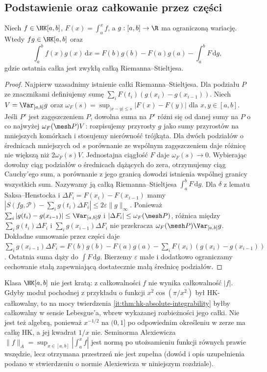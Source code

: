 \subsection{Podstawienie oraz całkowanie przez części}
\begin{twierdzenie}\label{ma1:kh:thm:bv-multiplier}
Niech $f\in\HK[a,b]$, $F(x)=\int_a^x f$, a $g:[a,b]\to\R$ ma ograniczoną wariację. Wtedy $fg\in\HK[a,b]$ oraz
\[
\int_a^b f(x)g(x)\,\mathrm dx=F(b)g(b)-F(a)g(a)-\int_a^b F\,\mathrm dg,
\]
gdzie ostatnia całka jest zwykłą całką Riemanna--Stieltjesa.
\end{twierdzenie}
\begin{proof}
Najpierw uzasadnimy istnienie całki Riemanna--Stieltjesa. Dla podziału $P$ ze znacznikami definiujemy sumę $\sum_i F(t_i)(g(x_i)-g(x_{i-1}))$. Niech $V=\Var_{[a,b]}g$ oraz $\omega_F(s)=\sup_{|x-y|\le s}|F(x)-F(y)|$ dla $x,y\in[a,b]$. Jeśli $P'$ jest zagęszczeniem $P$, dowolna suma na $P'$ różni się od danej sumy na $P$ o co najwyżej $\omega_F(\mesh P)V$: rozpisujemy przyrosty $g$ jako sumy przyrostów na mniejszych komórkach i stosujemy nierówność trójkąta. Dla dwóch podziałów o średnicach mniejszych od $s$ porównanie ze wspólnym zagęszczeniem daje różnicę nie większą niż $2\omega_F(s)V$. Jednostajna ciągłość $F$ daje $\omega_F(s)\to0$. Wybierając dowolny ciąg podziałów o średnicach dążących do zera, otrzymujemy ciąg Cauchy'ego sum, a porównanie z jego granicą dowodzi istnienia wspólnej granicy wszystkich sum. Nazywamy ją całką Riemanna--Stieltjesa $\int_a^b F\,\mathrm dg$. Dla $\delta$ z lematu Saksa--Henstocka i $\Delta F_i=F(x_i)-F(x_{i-1})$ mamy
$|S(fg,\mathcal P)-\sum_i g(t_i)\Delta F_i|\le2\varepsilon\|g\|_\infty$.
Ponieważ $\sum_i|g(t_i)-g(x_{i-1})|\le \Var_{[a,b]}g$ i $|\Delta F_i|\le\omega_F(\mesh P)$, różnica między $\sum_i g(t_i)\Delta F_i$ i $\sum_i g(x_{i-1})\Delta F_i$ nie przekracza $\omega_F(\mesh P)\Var_{[a,b]}g$. Dokładne sumowanie przez części daje
$\sum_i g(x_{i-1})\Delta F_i=F(b)g(b)-F(a)g(a)-\sum_iF(x_i)(g(x_i)-g(x_{i-1}))$.
Ostatnia suma dąży do $\int F\,\mathrm dg$. Bierzemy $\varepsilon$ małe i dodatkowo ograniczamy cechowanie stałą zapewniającą dostatecznie małą średnicę podziałów.
\end{proof}
\begin{uwaga}
Klasa $\HK[a,b]$ nie jest kratą: z całkowalności $f$ nie wynika całkowalność $|f|$. Gdyby moduł pochodnej z przykładu o funkcji $x^2\cos(\pi/x^2)$ był HK-całkowalny, to na mocy twierdzenia \ref{it:thm:hk-absolute-integrability} byłby całkowalny w sensie Lebesgue'a, wbrew wykazanej rozbieżności jego całki. Nie jest też algebrą, ponieważ $x^{-1/2}$ na $(0,1]$ po odpowiednim określeniu w zerze ma całkę HK, a jej kwadrat $1/x$ nie. Seminorma Alexiewicza $\|f\|_A=\sup_{x\in[a,b]}\left|\int_a^x f\right|$ jest normą po utożsamieniu funkcji równych prawie wszędzie, lecz otrzymana przestrzeń nie jest zupełna (dowód i opis uzupełnienia podano w stwierdzeniu o normie Alexiewicza w niniejszym rozdziale).
\end{uwaga}
